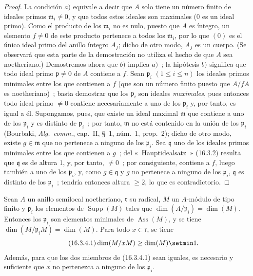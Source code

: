 \begin{proof}
La condición $a)$ equivale a decir que $A$ solo tiene un número finito de
ideales primos $\mathfrak{m}_i\neq0$, y que todos estos ideales son maximales
($0$ es un ideal primo). Como el producto de los $\mathfrak{m}_i$ no es nulo,
puesto que $A$ es íntegro, un elemento $f\neq0$ de este producto pertenece a
todos los $\mathfrak{m}_i$, por lo que $(0)$ es el único ideal primo del anillo
íntegro $A_f$; dicho de otro modo, $A_f$ es un cuerpo. (Se observará que esta
parte de la demostración no utiliza el hecho de que $A$ sea noetheriano.)
Demostremos ahora que $b)$ implica $a)$~; la hipótesis $b)$ significa que todo
ideal primo $\mathfrak{p}\neq0$ de $A$ contiene a $f$. Sean $\mathfrak{p}_i$
$(1\leq i\leq n)$ los ideales primos minimales entre los que contienen a $f$
(que son un número finito puesto que $A/fA$ es noetheriano)~; basta demostrar
que los $\mathfrak{p}_i$ son ideales \emph{maximales}, pues entonces todo ideal
primo $\neq0$ contiene necesariamente a uno de los $\mathfrak{p}_i$ y, por
tanto, es igual a él. Supongamos, pues, que existe un ideal maximal
$\mathfrak{m}$ que contiene a uno de los $\mathfrak{p}_i$ y es distinto de
$\mathfrak{p}_i$~; por tanto, $\mathfrak{m}$ no está contenido en la unión de
los $\mathfrak{p}_i$ (Bourbaki, \emph{Alg.~comm.}, cap.~II, \S~1, núm.~1,
prop.~2); dicho de otro modo, existe $g\in\mathfrak{m}$ que no pertenece a
ninguno de los $\mathfrak{p}_i$. Sea $\mathfrak{q}$ uno de los ideales primos
minimales entre los que contienen a $g$~; del «~Hauptidealsatz~» (16.3.2)
resulta que $\mathfrak{q}$ es de altura 1, y, por tanto, $\neq0$~; por
consiguiente, contiene a $f$, luego también a uno de los $\mathfrak{p}_i$, y,
como $g\in\mathfrak{q}$ y $g$ no pertenece a ninguno de los
$\mathfrak{p}_i$, $\mathfrak{q}$ es distinto de los $\mathfrak{p}_i$~; tendría
entonces altura $\geq2$, lo que es contradictorio.
\end{proof}

\begin{proposition}[16.3.4]
\label{0.16.3.4-fr}
Sean $A$ un anillo semilocal noetheriano, $\mathfrak{r}$ su radical, $M$ un
$A$-módulo de tipo finito y $\mathfrak{p}_i$ los elementos de
$\operatorname{Supp}(M)$ tales que
$\dim(A/\mathfrak{p}_i)=\dim(M)$. Entonces los $\mathfrak{p}_i$ son elementos
minimales de $\operatorname{Ass}(M)$, y se tiene
$\dim(M/\mathfrak{p}_iM)=\dim(M)$. Para todo $x\in\mathfrak{r}$, se tiene
\begin{equation}
\label{0.16.3.4.1-fr}
\tag{16.3.4.1}
  \dim(M/xM)\geq\dim(M)\setmin 1.
\end{equation}
Además, para que los dos miembros de \textup{(16.3.4.1)} sean iguales, es necesario y
suficiente que $x$ no pertenezca a ninguno de los $\mathfrak{p}_i$.
\end{proposition}

